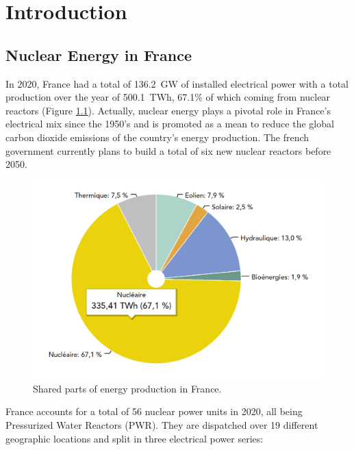 
\chapter{Introduction} %

\label{ch:introduction} %




\minitoc

\section{Nuclear Energy in France}

In 2020, France had a total of 136.2~GW of installed electrical power with a total production over the year of 500.1~TWh, 67.1\% of which coming from nuclear reactors (Figure \ref{fig:france_energy_mix}). Actually, nuclear energy plays a pivotal role in France's electrical mix since the 1950's and is promoted as a mean to reduce the global carbon dioxide emissions of the country's energy production. The french government currently plans to build a total of six new nuclear reactors before 2050.

\begin{figure}[!h]
\centering
\includegraphics[width=0.6\linewidth]{img/intro/energy_mix.PNG}
\caption{Shared parts of energy production in France. \cite{rte_website} }
\label{fig:france_energy_mix}
\end{figure}

\npar

France accounts for a total of 56 nuclear power units in 2020, all being Pressurized Water Reactors (PWR). They are dispatched over 19 different geographic locations and split in three electrical power series:

